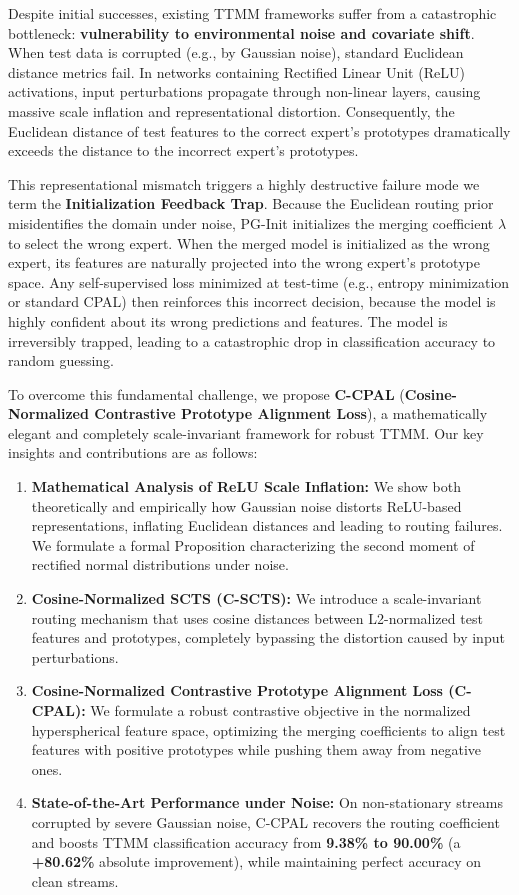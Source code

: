 \documentclass{article}
\theoremstyle{plain}
\theoremstyle{definition}
\theoremstyle{remark}
\begin{document}
Despite initial successes, existing TTMM frameworks suffer from a catastrophic bottleneck: \textbf{vulnerability to environmental noise and covariate shift}. 
When test data is corrupted (e.g., by Gaussian noise), standard Euclidean distance metrics fail. In networks containing Rectified Linear Unit (ReLU) activations, input perturbations propagate through non-linear layers, causing massive scale inflation and representational distortion. Consequently, the Euclidean distance of test features to the correct expert's prototypes dramatically exceeds the distance to the incorrect expert's prototypes. 

This representational mismatch triggers a highly destructive failure mode we term the \textbf{Initialization Feedback Trap}. Because the Euclidean routing prior misidentifies the domain under noise, PG-Init initializes the merging coefficient $\lambda$ to select the wrong expert. When the merged model is initialized as the wrong expert, its features are naturally projected into the wrong expert's prototype space. Any self-supervised loss minimized at test-time (e.g., entropy minimization or standard CPAL) then reinforces this incorrect decision, because the model is highly confident about its wrong predictions and features. The model is irreversibly trapped, leading to a catastrophic drop in classification accuracy to random guessing.

To overcome this fundamental challenge, we propose \textbf{C-CPAL} (\textbf{Cosine-Normalized Contrastive Prototype Alignment Loss}), a mathematically elegant and completely scale-invariant framework for robust TTMM. Our key insights and contributions are as follows:
\begin{enumerate}
    \item \textbf{Mathematical Analysis of ReLU Scale Inflation:} We show both theoretically and empirically how Gaussian noise distorts ReLU-based representations, inflating Euclidean distances and leading to routing failures. We formulate a formal Proposition characterizing the second moment of rectified normal distributions under noise.
    \item \textbf{Cosine-Normalized SCTS (C-SCTS):} We introduce a scale-invariant routing mechanism that uses cosine distances between L2-normalized test features and prototypes, completely bypassing the distortion caused by input perturbations.
    \item \textbf{Cosine-Normalized Contrastive Prototype Alignment Loss (C-CPAL):} We formulate a robust contrastive objective in the normalized hyperspherical feature space, optimizing the merging coefficients to align test features with positive prototypes while pushing them away from negative ones.
    \item \textbf{State-of-the-Art Performance under Noise:} On non-stationary streams corrupted by severe Gaussian noise, C-CPAL recovers the routing coefficient and boosts TTMM classification accuracy from \textbf{9.38\% to 90.00\%} (a \textbf{+80.62\%} absolute improvement), while maintaining perfect accuracy on clean streams.
\end{enumerate}
\end{document}
